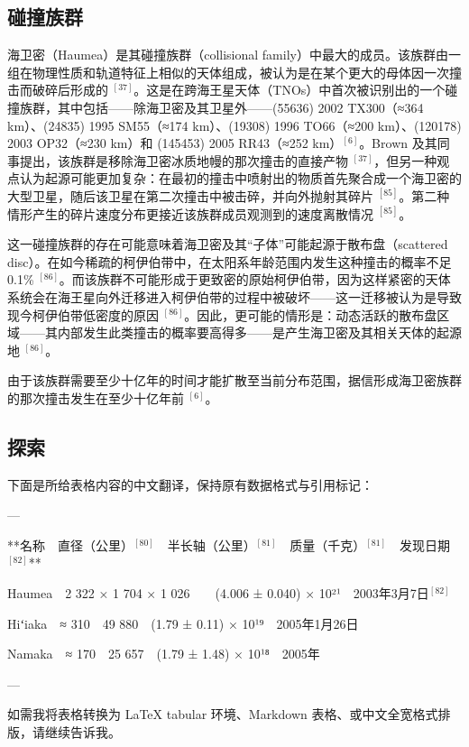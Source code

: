 \subsection{碰撞族群}
海卫密（Haumea）是其碰撞族群（collisional family）中最大的成员。该族群由一组在物理性质和轨道特征上相似的天体组成，被认为是在某个更大的母体因一次撞击而破碎后形成的 $^{[37]}$。这是在跨海王星天体（TNOs）中首次被识别出的一个碰撞族群，其中包括——除海卫密及其卫星外——(55636) 2002 TX300（≈364 km）、(24835) 1995 SM55（≈174 km）、(19308) 1996 TO66（≈200 km）、(120178) 2003 OP32（≈230 km）和 (145453) 2005 RR43（≈252 km）$^{[6]}$。Brown 及其同事提出，该族群是移除海卫密冰质地幔的那次撞击的直接产物 $^{[37]}$，但另一种观点认为起源可能更加复杂：在最初的撞击中喷射出的物质首先聚合成一个海卫密的大型卫星，随后该卫星在第二次撞击中被击碎，并向外抛射其碎片 $^{[85]}$。第二种情形产生的碎片速度分布更接近该族群成员观测到的速度离散情况 $^{[85]}$。

这一碰撞族群的存在可能意味着海卫密及其“子体”可能起源于散布盘（scattered disc）。在如今稀疏的柯伊伯带中，在太阳系年龄范围内发生这种撞击的概率不足 0.1\% $^{[86]}$。而该族群不可能形成于更致密的原始柯伊伯带，因为这样紧密的天体系统会在海王星向外迁移进入柯伊伯带的过程中被破坏——这一迁移被认为是导致现今柯伊伯带低密度的原因 $^{[86]}$。因此，更可能的情形是：动态活跃的散布盘区域——其内部发生此类撞击的概率要高得多——是产生海卫密及其相关天体的起源地 $^{[86]}$。

由于该族群需要至少十亿年的时间才能扩散至当前分布范围，据信形成海卫密族群的那次撞击发生在至少十亿年前 $^{[6]}$。
\subsection{探索}
下面是所给表格内容的中文翻译，保持原有数据格式与引用标记：

---

**名称　直径（公里）$^{[80]}$　半长轴（公里）$^{[81]}$　质量（千克）$^{[81]}$　发现日期$^{[82]}$**

Haumea　2 322 × 1 704 × 1 026　　(4.006 ± 0.040) × 10²¹　2003年3月7日$^{[82]}$

Hiʻiaka　≈ 310　49 880　(1.79 ± 0.11) × 10¹⁹　2005年1月26日

Namaka　≈ 170　25 657　(1.79 ± 1.48) × 10¹⁸　2005年

---

如需我将表格转换为 LaTeX tabular 环境、Markdown 表格、或中文全宽格式排版，请继续告诉我。
